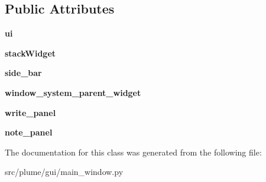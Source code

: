 \subsection*{Public Attributes}
\begin{DoxyCompactItemize}
\item 
{\bfseries ui}\hypertarget{classplume-creator_1_1src_1_1plume_1_1gui_1_1main__window_1_1_main_window_aea5d45a90041e3a45bffd774472bbf93}{}\label{classplume-creator_1_1src_1_1plume_1_1gui_1_1main__window_1_1_main_window_aea5d45a90041e3a45bffd774472bbf93}

\item 
{\bfseries stack\+Widget}\hypertarget{classplume-creator_1_1src_1_1plume_1_1gui_1_1main__window_1_1_main_window_a5cd152fcdc917e75b5d796b94b29d267}{}\label{classplume-creator_1_1src_1_1plume_1_1gui_1_1main__window_1_1_main_window_a5cd152fcdc917e75b5d796b94b29d267}

\item 
{\bfseries side\+\_\+bar}\hypertarget{classplume-creator_1_1src_1_1plume_1_1gui_1_1main__window_1_1_main_window_a91692f59d93d54961a14dff4499a4ccd}{}\label{classplume-creator_1_1src_1_1plume_1_1gui_1_1main__window_1_1_main_window_a91692f59d93d54961a14dff4499a4ccd}

\item 
{\bfseries window\+\_\+system\+\_\+parent\+\_\+widget}\hypertarget{classplume-creator_1_1src_1_1plume_1_1gui_1_1main__window_1_1_main_window_a34e570299e6fc6d99e9fffbf5980b309}{}\label{classplume-creator_1_1src_1_1plume_1_1gui_1_1main__window_1_1_main_window_a34e570299e6fc6d99e9fffbf5980b309}

\item 
{\bfseries write\+\_\+panel}\hypertarget{classplume-creator_1_1src_1_1plume_1_1gui_1_1main__window_1_1_main_window_accb053cf909cfc98596d550c1859f1bf}{}\label{classplume-creator_1_1src_1_1plume_1_1gui_1_1main__window_1_1_main_window_accb053cf909cfc98596d550c1859f1bf}

\item 
{\bfseries note\+\_\+panel}\hypertarget{classplume-creator_1_1src_1_1plume_1_1gui_1_1main__window_1_1_main_window_a96c9c8725f9e71f4c26e157beaef14c0}{}\label{classplume-creator_1_1src_1_1plume_1_1gui_1_1main__window_1_1_main_window_a96c9c8725f9e71f4c26e157beaef14c0}

\end{DoxyCompactItemize}


The documentation for this class was generated from the following file\+:\begin{DoxyCompactItemize}
\item 
src/plume/gui/main\+\_\+window.\+py\end{DoxyCompactItemize}
